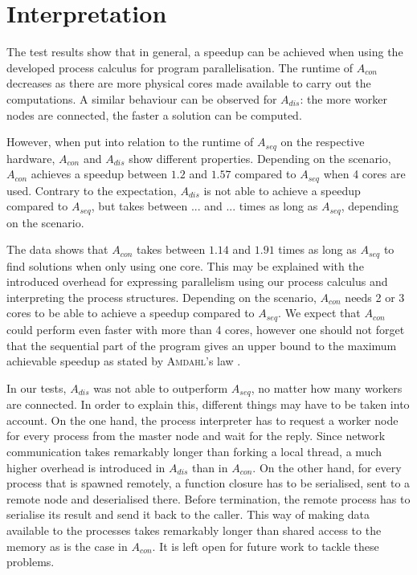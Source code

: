 \clearpage
\section{Interpretation}
The test results show that in general, a speedup can be achieved when using the developed process calculus for program parallelisation. The runtime of $A_{con}$ decreases as there are more physical cores made available to carry out the computations. A similar behaviour can be observed for $A_{dis}$: the more worker nodes are connected, the faster a solution can be computed.

However, when put into relation to the runtime of $A_{seq}$ on the respective hardware, $A_{con}$ and $A_{dis}$ show different properties. Depending on the scenario, $A_{con}$ achieves a speedup between $1.2$ and $1.57$ compared to $A_{seq}$ when 4 cores are used. Contrary to the expectation, $A_{dis}$ is not able to achieve a speedup compared to $A_{seq}$, but takes between ... and ... times as long as $A_{seq}$, depending on the scenario.

The data shows that $A_{con}$ takes between $1.14$ and $1.91$ times as long as $A_{seq}$ to find solutions when only using one core. This may be explained with the introduced overhead for expressing parallelism using our process calculus and interpreting the process structures. Depending on the scenario, $A_{con}$ needs 2 or 3 cores to be able to achieve a speedup compared to $A_{seq}$. We expect that $A_{con}$ could perform even faster with more than 4 cores, however one should not forget that the sequential part of the program gives an upper bound to the maximum achievable speedup as stated by \textsc{Amdahl}'s law \cite{}.

In our tests, $A_{dis}$ was not able to outperform $A_{seq}$, no matter how many workers are connected. In order to explain this, different things may have to be taken into account. On the one hand, the process interpreter has to request a worker node for every process from the master node and wait for the reply. Since network communication takes remarkably longer than forking a local thread, a much higher overhead is introduced in $A_{dis}$ than in $A_{con}$. On the other hand, for every process that is spawned remotely, a function closure has to be serialised, sent to a remote node and deserialised there. Before termination, the remote process has to serialise its result and send it back to the caller. This way of making data available to the processes takes remarkably longer than shared access to the memory as is the case in $A_{con}$. It is left open for future work to tackle these problems.